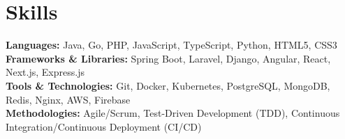 \documentclass[11pt,letterpaper]{article}
\begin{document}
\section{Skills}
\textbf{Languages:} Java, Go, PHP, JavaScript, TypeScript, Python, HTML5, CSS3\\
\textbf{Frameworks \& Libraries:} Spring Boot, Laravel, Django, Angular, React, Next.js, Express.js\\
\textbf{Tools \& Technologies:} Git, Docker, Kubernetes, PostgreSQL, MongoDB, Redis, Nginx, AWS, Firebase\\
\textbf{Methodologies:} Agile/Scrum, Test-Driven Development (TDD), Continuous Integration/Continuous Deployment (CI/CD)
\end{document}

